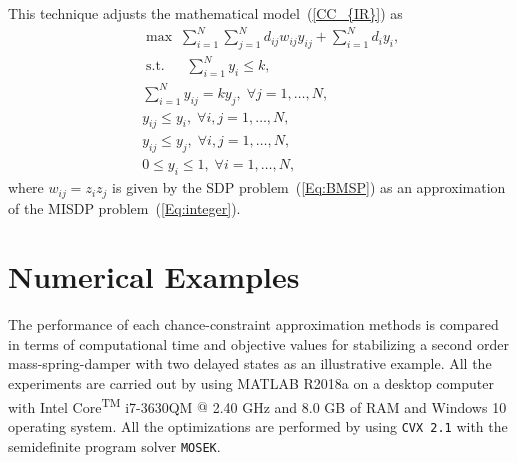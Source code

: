\documentclass[journal]{IEEEtran}
\def \st {\operatorname{s.t.}\quad }
\begin{document}
This technique adjusts the mathematical model~(\ref{CC_{IR}}) as
\begin{eqnarray}\label{key}
	&&\max \; \sum_{i=1}^{N} \sum_{j=1}^{N} d_{ij}w_{ij}y_{ij}+ \sum_{i=1}^{N} d_{i}y_{i}, \nonumber \\
	&&\st \; \sum_{i=1}^{N}y_i \leq k,\nonumber \\
	&&\sum_{i=1}^{N}y_{ij} = ky_j, \; \forall j=1,\ldots,N, \nonumber\\
	&&y_{ij} \leq y_i, \; \forall i,j=1,\ldots,N, \nonumber\\
	&&y_{ij} \leq y_j, \; \forall i,j=1,\ldots,N, \nonumber\\
	&&0 \leq y_i \leq 1, \; \forall i=1,\ldots,N,
\end{eqnarray}
where $w_{ij}=z_iz_j$ is given by the SDP problem~(\ref{Eq:BMSP}) as an approximation of the MISDP problem~(\ref{Eq:integer}).


\section{Numerical Examples} \label{sect:sect6}
The performance of each chance-constraint approximation methods is compared in terms of computational time and objective values for stabilizing a second order mass-spring-damper with two delayed states as an illustrative example.
All the experiments are carried out by using MATLAB R2018a on a desktop computer with Intel Core\textsuperscript{TM} i7-3630QM $ @ $ 2.40 GHz and 8.0 GB of RAM and Windows 10 operating system. All the optimizations are performed by using \texttt{CVX 2.1} with the semidefinite program solver \texttt{MOSEK}.
\end{document}
